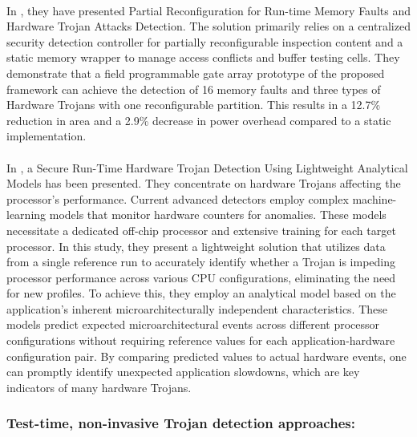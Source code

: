 \paragraph*{}
In \cite{9840090}, they have presented Partial Reconfiguration for Run-time Memory Faults and Hardware Trojan Attacks Detection. The solution primarily relies on a centralized security detection controller for partially reconfigurable inspection content and a static memory wrapper to manage access conflicts and buffer testing cells. They demonstrate that a field programmable gate array prototype of the proposed framework can achieve the detection of 16 memory faults and three types of Hardware Trojans with one reconfigurable partition. This results in a 12.7\% reduction in area and a 2.9\% decrease in power overhead compared to a static implementation.
\paragraph*{}
In \cite{10251968}, a Secure Run-Time Hardware Trojan Detection Using Lightweight Analytical Models has been presented. They concentrate on hardware Trojans affecting the processor's performance. Current advanced detectors employ complex machine-learning models that monitor hardware counters for anomalies. These models necessitate a dedicated off-chip processor and extensive training for each target processor. In this study, they present a lightweight solution that utilizes data from a single reference run to accurately identify whether a Trojan is impeding processor performance across various CPU configurations, eliminating the need for new profiles. To achieve this, they employ an analytical model based on the application's inherent microarchitecturally independent characteristics. These models predict expected microarchitectural events across different processor configurations without requiring reference values for each application-hardware configuration pair. By comparing predicted values to actual hardware events, one can promptly identify unexpected application slowdowns, which are key indicators of many hardware Trojans.
\subsubsection{Test-time, non-invasive Trojan detection approaches:}
